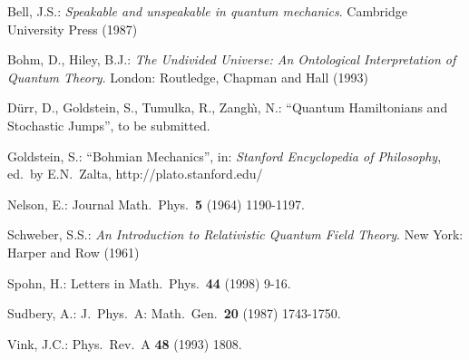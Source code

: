 \documentclass[12pt]{article}
\begin{document}
\begin{thebibliography}{[8]}

 Bell, J.S.: \textit{Speakable and unspeakable in
  quantum mechanics}. Cambridge University Press (1987)

 Bohm, D., Hiley, B.J.: \textit{The Undivided Universe: An
  Ontological Interpretation of Quantum Theory}. London: Routledge,
  Chapman and Hall (1993)


 D\"urr, D., Goldstein, S., Tumulka, R., Zangh\`\i,
  N.: ``Quantum Hamiltonians and Stochastic Jumps'', to be submitted.

 Goldstein, S.: ``Bohmian Mechanics'', in:
  \textit{Stanford Encyclopedia of Philosophy}, ed.\ by E.N.~Zalta,
  http://plato.stanford.edu/

 Nelson, E.: Journal Math.\ Phys.\ \textbf{5} (1964)
  1190-1197.

 Schweber, S.S.: \textit{An Introduction to
  Relativistic Quantum Field Theory}. New York: Harper and Row (1961)

 Spohn, H.: 
  Letters in Math.\ Phys.\ \textbf{44} (1998) 9-16.

 Sudbery, A.: J.\ Phys.\ A: Math.\ Gen.\ \textbf{20}
  (1987) 1743-1750.

 Vink, J.C.: Phys.\ Rev.\ A \textbf{48} (1993) 1808.


\end{thebibliography}
\end{document}
